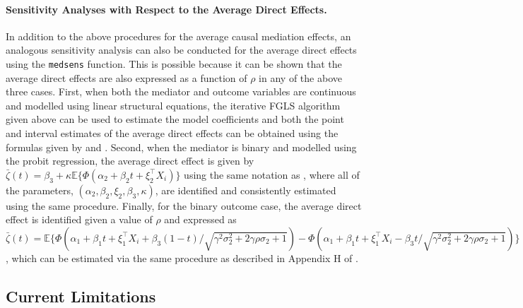 \documentclass[11pt,letterpaper]{article}
\theoremstyle{plain}
\newcommand\E{\mathbb{E}}
\begin{document}
\paragraph{Sensitivity Analyses with Respect to the Average Direct Effects.}
In addition to the above procedures for the average causal mediation effects,
an analogous sensitivity analysis can also be conducted for the average direct 
effects using the {\tt medsens} function.  This is possible because it can be
shown that the average direct effects are also expressed as a function of $\rho$
in any of the above three cases.  First, when both the mediator and outcome variables
are continuous and modelled using linear structural equations, the iterative FGLS algorithm
given above can be used to estimate the model coefficients and both the point and interval
estimates of the average direct effects can be obtained using the formulas given by
\citet[Section 4.1]{imai:keel:yama:10} and \citet[p.314 and Appendix A]{imai:keel:ting:10}.
Second, when the mediator is binary and modelled using the probit regression,
the average direct effect is given by $\bar\zeta(t) = \beta_3 + \kappa\E\{
\Phi(\alpha_2 + \beta_2 t + \xi_2^\top X_i)\}$ using the same notation as
\citet[footnote 12]{imai:keel:ting:10}, where all of the parameters, $(\alpha_2,
\beta_2, \xi_2, \beta_3, \kappa)$, are identified and consistently estimated
using the same procedure.  Finally, for the binary outcome case,
the average direct effect is identified given a value of $\rho$ and expressed
as $\bar\zeta(t) = \E\{\Phi(\alpha_1 + \beta_1 t + \xi_1^\top X_i +
\beta_3(1-t)/\sqrt{\gamma^2\sigma_2^2 + 2\gamma\rho\sigma_2 + 1})
- \Phi(\alpha_1 + \beta_1 t + \xi_1^\top X_i - \beta_3 t/\sqrt{\gamma^2\sigma_2^2 + 2\gamma\rho\sigma_2 + 1}) \}$, which can be estimated via the same procedure as
described in Appendix H of \citet{imai:keel:ting:10}.

\subsection{Current Limitations}
\end{document}
